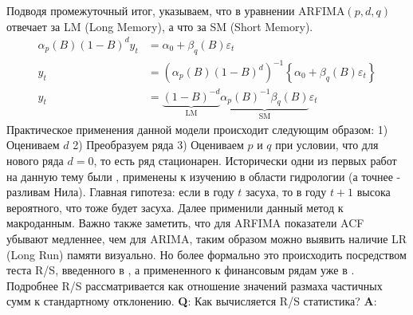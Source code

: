 Подводя промежуточный итог, указываем, что в уравнении ARFIMA$(p, d, q)$ отвечает за LM (Long Memory), а что за SM (Short Memory).
\begin{equation}
	\begin{split}
		\alpha_p(B) (1 - B)^d y_t & = \alpha_0 + \beta_{q}(B) \varepsilon_{t}\\
		y_t & = \left(\alpha_p(B) (1 - B)^d\right)^{-1} \left\{\alpha_0 + \beta_{q}(B) \varepsilon_{t}\right\}\\
		y_t & = \underbrace{(1 - B)^{-d}}_{\text{LM}} \underbrace{\alpha_p(B)^{-1} \beta_{q}(B)}_{\text{SM}} \varepsilon_{t}
	\end{split}
\end{equation}
Практическое применения данной модели происходит следующим образом: 1) Оцениваем $d$ 2) Преобразуем ряда 3) Оцениваем $p$ и $q$ при условии, что для нового ряда $d = 0$, то есть ряд стационарен. Исторически одни из первых работ на данную тему были \cite{hosking_1981}, \cite{hurst1951long} применены к изучению в области гидрологии (а точнее - разливам Нила). Главная гипотеза: если в году $t$ засуха, то в году $t + 1$ высока вероятного, что тоже будет засуха. Далее \cite{granger1980introduction} применили данный метод к макроданным. Важно также заметить, что для ARFIMA показатели ACF убывают медленнее, чем для ARIMA, таким образом можно выявить наличие LR (Long Run) памяти визуально. Но более формально это происходить посредством теста R/S, введенного в \cite{hurst1951long}, а примененного к финансовым рядам уже в \cite{mandelbrot1972statistical}. Подробнее R/S рассматривается как отношение значений размаха частичных сумм к стандартному отклонению. \textbf{Q}: Как вычисляется R/S статистика? \textbf{A}:
